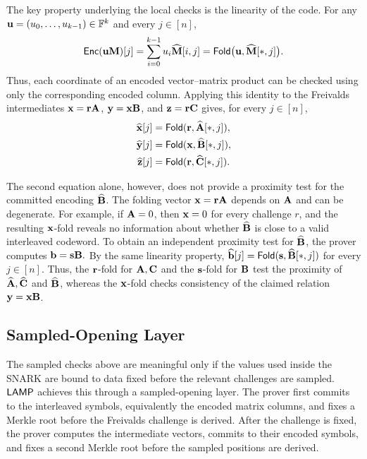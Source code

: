 \begin{revblock}
The key property underlying the local checks is the linearity of the code.
For any $\mathbf{u}=(u_0,\ldots,u_{k-1})\in\mathbb{F}^k$ and every $j \in [n]$,
\[
  \mathsf{Enc}(\mathbf{u}\mathbf{M})[j] = \sum_{i=0}^{k-1} u_i\widehat{\mathbf{M}}[i,j] = \textsf{Fold}\bigl( \mathbf{u}, \widehat{\mathbf{M}}[*,j] \bigr).
\]
Thus, each coordinate of an encoded vector--matrix product can be checked
using only the corresponding encoded column.
Applying this identity to the Freivalds intermediates
\(\mathbf{x}=\mathbf{r}\mathbf{A}\),
\(\mathbf{y}=\mathbf{x}\mathbf{B}\), and
\(\mathbf{z}=\mathbf{r}\mathbf{C}\)
gives, for every \(j\in[n]\),
\[
\begin{aligned}
\widehat{\mathbf{x}}[j]
  &= \textsf{Fold}(\mathbf{r},\widehat{\mathbf{A}}[*,j]),\\
\widehat{\mathbf{y}}[j]
  &= \textsf{Fold}(\mathbf{x},\widehat{\mathbf{B}}[*,j]),\\
\widehat{\mathbf{z}}[j]
  &= \textsf{Fold}(\mathbf{r},\widehat{\mathbf{C}}[*,j]).
\end{aligned}
\]
\end{revblock}

\begin{revblock}
  The second equation alone, however, does not provide a proximity test for the
committed encoding $\widehat{\mathbf{B}}$. The folding vector $\mathbf{x}=\mathbf{r}\mathbf{A}$ depends on $\mathbf{A}$ and can be degenerate.
For example, if \(\mathbf{A}=0\), then \(\mathbf{x}=0\) for every challenge \(r\), and the resulting $\mathbf{x}$-fold reveals no information about whether $\widehat{\mathbf{B}}$ is close to a valid interleaved codeword.
To obtain an independent proximity test for $\widehat{\mathbf{B}}$, the
prover computes $\mathbf{b}=\mathbf{s}\mathbf{B}.$
By the same linearity property, $\widehat{\mathbf{b}}[j] = \textsf{Fold}(\mathbf{s}, \widehat{\mathbf{B}}[*, j])$ for every $j \in [n]$.
Thus, the $\mathbf{r}$-fold for $\mathbf{A}, \mathbf{C}$ and the $\mathbf{s}$-fold for $\mathbf{B}$ test the proximity of $\widehat{\mathbf{A}}, \widehat{\mathbf{C}}$ and $\widehat{\mathbf{B}}$, whereas the $\mathbf{x}$-fold checks consistency of the claimed relation $\mathbf{y} = \mathbf{x}\mathbf{B}$.
\end{revblock}



\subsection{Sampled-Opening Layer}
\label{sec:overview-commit-link}

The sampled checks above are meaningful only if the values used inside the
SNARK are bound to data fixed before the relevant challenges are sampled.
\(\textsf{LAMP}\) achieves this through a sampled-opening layer.
The prover first commits to the interleaved symbols, equivalently the encoded
matrix columns, and fixes a Merkle root before the Freivalds challenge is
derived.  After the challenge is fixed, the prover computes the intermediate
vectors, commits to their encoded symbols, and fixes a second Merkle root before
the sampled positions are derived.


